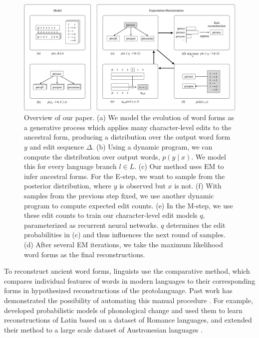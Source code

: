 \documentclass[11pt]{article}
\begin{document}
\begin{figure}
\centering 
\includegraphics[width=1.0\textwidth]{images/main-figure.pdf}
\caption{Overview of our paper. (a) We model the evolution of word forms as a generative process which applies many character-level edits to the ancestral form, producing a distribution over the output word form $y$ and edit sequence $\Delta$. (b) Using a dynamic program, we can compute the distribution over output words, $p(y \mid x)$. We model this for every language branch $l \in L$. (c) Our method uses EM to infer ancestral forms. For the E-step, we want to sample from the posterior distribution, where $y$ is observed but $x$ is not. (f) With samples from the previous step fixed, we use another dynamic program to compute expected edit counts. (e) In the M-step, we use these edit counts to train our character-level edit models $q$, parameterized as recurrent neural networks. $q$ determines the edit probabilities in (c) and thus influences the next round of samples. (d) After several EM iterations, we take the maximum likelihood word forms as the final reconstructions.}
\label{fig:overview}
\end{figure}


To reconstruct ancient word forms, linguists use the comparative method, which compares individual features of words in modern languages to their corresponding forms in hypothesized reconstructions of the protolanguage. Past work has demonstrated the possibility of automating this manual procedure \citep{durham1969application, eastlack1977iberochange, lowe1994reconstruction, covington-1998-alignment-multiple, kondrak2002algorithms}.
For example, \citet{bouchard-etal-2007-probabilistic, NIPS2007_7ce3284b} developed probabilistic models of phonological change and used them to learn reconstructions of Latin based on a dataset of Romance languages, and  \citet{bouchard-cote-etal-2009-improved, doi:10.1073/pnas.1204678110} extended their method to a large scale dataset of Austronesian languages \citep{greenhill2008austronesian}.
\end{document}
